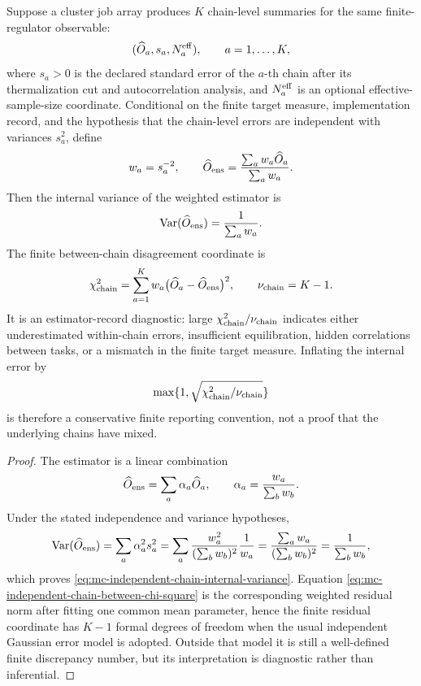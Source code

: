 \begin{proposition}
\label{prop:mc-independent-chain-aggregation-record}
Suppose a cluster job array produces \(K\) chain-level summaries for the same
finite-regulator observable:
\[
  (\widehat O_a,s_a,N_a^{\rm eff}),\qquad a=1,\ldots,K,
\]
where \(s_a>0\) is the declared standard error of the \(a\)-th chain after its
thermalization cut and autocorrelation analysis, and \(N_a^{\rm eff}\) is an
optional effective-sample-size coordinate.  Conditional on the finite target
measure, implementation record, and the hypothesis that the chain-level errors
are independent with variances \(s_a^2\), define
\[
  w_a=s_a^{-2},\qquad
  \widehat O_{\rm ens}
  =
  \frac{\sum_a w_a\widehat O_a}{\sum_a w_a}.
\]
Then the internal variance of the weighted estimator is
\begin{equation}
  \operatorname{Var}(\widehat O_{\rm ens})
  =
  \frac{1}{\sum_a w_a}.
  \label{eq:mc-independent-chain-internal-variance}
\end{equation}
The finite between-chain disagreement coordinate is
\begin{equation}
  \chi^2_{\rm chain}
  =
  \sum_{a=1}^K w_a
  \bigl(\widehat O_a-\widehat O_{\rm ens}\bigr)^2,
  \qquad
  \nu_{\rm chain}=K-1 .
  \label{eq:mc-independent-chain-between-chi-square}
\end{equation}
It is an estimator-record diagnostic: large
\(\chi^2_{\rm chain}/\nu_{\rm chain}\) indicates either underestimated
within-chain errors, insufficient equilibration, hidden correlations between
tasks, or a mismatch in the finite target measure.  Inflating the internal
error by
\[
  \max\{1,\sqrt{\chi^2_{\rm chain}/\nu_{\rm chain}}\}
\]
is therefore a conservative finite reporting convention, not a proof that the
underlying chains have mixed.
\end{proposition}

\begin{proof}
The estimator is a linear combination
\[
  \widehat O_{\rm ens}=\sum_a \alpha_a\widehat O_a,
  \qquad
  \alpha_a=\frac{w_a}{\sum_b w_b}.
\]
Under the stated independence and variance hypotheses,
\[
  \operatorname{Var}(\widehat O_{\rm ens})
  =
  \sum_a\alpha_a^2s_a^2
  =
  \sum_a
  \frac{w_a^2}{(\sum_b w_b)^2}\frac1{w_a}
  =
  \frac{\sum_a w_a}{(\sum_b w_b)^2}
  =
  \frac1{\sum_b w_b},
\]
which proves \eqref{eq:mc-independent-chain-internal-variance}.  Equation
\eqref{eq:mc-independent-chain-between-chi-square} is the corresponding
weighted residual norm after fitting one common mean parameter, hence the
finite residual coordinate has \(K-1\) formal degrees of freedom when the
usual independent Gaussian error model is adopted.  Outside that model it is
still a well-defined finite discrepancy number, but its interpretation is
diagnostic rather than inferential.
\end{proof}

